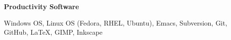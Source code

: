 \documentclass[10pt]{article}
\begin{document}
\textbf{Productivity Software}
\begin{innerlist}
  \item Windows OS, Linux OS (Fedora, RHEL, Ubuntu), Emacs,
    Subversion, Git, GitHub, \LaTeX, GIMP, Inkscape
\end{innerlist} 








\end{document}
